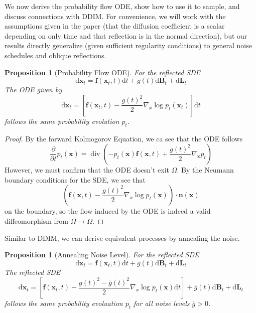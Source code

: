 \documentclass{article}
\theoremstyle{plain}
\newtheorem{proposition}[theorem]{Proposition}
\theoremstyle{definition}
\theoremstyle{remark}
\DeclareMathOperator{\ddiv}{div}
\newcommand{\sqbrac}[1]{\left[#1\right]}
\newcommand{\grad}{\nabla}
\newcommand{\parderiv}[2]{\frac{\partial #1}{\partial #2}}
\renewcommand{\vec}{\mathbf}
\newcommand{\dd}{\mathrm{d}}
\begin{document}
We now derive the probability flow ODE, show how to use it to sample, and discuss connections with DDIM. For convenience, we will work with the assumptions given in the paper (that the diffusion coefficient is a scalar depending on only time and that reflection is in the normal direction), but our results directly generalize (given sufficient regularity conditions) to general noise schedules and oblique reflections.

\begin{proposition}[Probability Flow ODE]
    For the reflected SDE
    \begin{equation}
        \dd\vec{x}_t = \vec{f}(\vec{x}_t, t)\dd t + g(t) \dd \vec{B}_t + \dd \vec{L}_t
    \end{equation}
    The ODE given by
    \begin{equation}
        \dd \vec{x}_t = \sqbrac{\vec{f}(\vec{x}_t, t) - \frac{g(t)^2}{2} \grad_x \log p_t(\vec{x}_t)} \dd t
    \end{equation}
    follows the same probability evolution $p_t$.
\end{proposition}
\begin{proof}
    By the forward Kolmogorov Equation, we ca see that the ODE follows
    \begin{equation}
        \parderiv{}{t}p_t(\vec{x}) = \ddiv(- p_t(\vec{x}) \vec{f}(\vec{x}, t) + \frac{g(t)^2}{2}\grad_\vec{x} p_t)
    \end{equation}
    However, we must confirm that the ODE doesn't exit $\Omega$. By the Neumann boundary conditions for the SDE, we see that 
    \begin{equation}
        (\vec{f}(\vec{x}, t) - \frac{g(t)^2}{2} \grad_x \log p_t(\vec{x})) \cdot \vec{n}(\vec{x})
    \end{equation}
    on the boundary, so the flow induced by the ODE is indeed a valid diffeomorphism from $\Omega \to \Omega$.
\end{proof}
Similar to DDIM, we can derive equivalent processes by annealing the noise.
\begin{proposition}[Annealing Noise Level]
    For the reflected SDE
    \begin{equation}
        \dd\vec{x}_t = \vec{f}(\vec{x}_t, t)\dd t + g(t) \dd \vec{B}_t + \dd \vec{L}_t
    \end{equation}
    The reflected SDE
    \begin{equation}
        \dd\vec{x}_t = \sqbrac{\vec{f}(\vec{x}_t, t) - \frac{g(t)^2 - \overline{g}(t)^2}{2} \grad_x \log p_t(\vec{x}) \dd t} + \overline{g}(t) \dd \vec{B}_t + \dd \vec{L}_t
    \end{equation}
    follows the same probability evoluation $p_t$ for all noise levels $\overline{g} > 0$.
\end{proposition}
\end{document}
